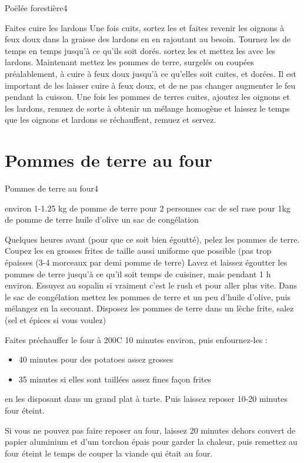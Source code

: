 {\begin{recette}{Poëlée forestière}{4}{}{}
\begin{preparation}
\etape Faites cuire les lardons
\etape Une fois cuits, sortez les et faites revenir les oignons à feux doux dans la graisse des lardons en en rajoutant au 
besoin. Tournez les de temps en temps jusqu'à ce qu'ils soit dorés.
\etape sortez les et mettez les avec les lardons. Maintenant mettez les pommes de terre, surgelés ou coupées préalablement, à 
cuire à feux doux jusqu'à ce qu'elles soit cuites, et dorées. Il est important de les laisser cuire à feux doux, et de ne pas 
changer augmenter le feu pendant la cuisson.
\etape Une fois les pommes de terres cuites, ajoutez les oignons et les lardons, remuez de sorte à obtenir un mélange homogène 
et laissez le temps que les oignons et lardons se réchauffent, remuez et servez.
\end{preparation}
\end{recette}

\section{Pommes de terre au four}
\begin{recette}{Pommes de terre au four}{4}{}{}\label{sec:pomme-de-terre-four}
\begin{ingredients}
\ingredient environ 1-1.25 kg de pomme de terre pour 2 personnes
 cac de sel rase pour 1kg de pomme de terre 
\ingredient huile d'olive
\ingredient un sac de congélation
\end{ingredients}

\begin{preparation}
\etape Quelques heures avant (pour que ce soit bien égoutté), pelez les pommes de terre. Coupez les en grosses frites de taille aussi uniforme que possible (pas trop épaisses (3-4 morceaux par demi pomme de terre)
\etape Lavez et laissez égoutter les pommes de terre jusqu'à ce qu'il soit temps de cuisiner, mais pendant 1 h environ. Essuyez au sopalin si vraiment c'est le rush et pour aller plus vite.
\etape Dans le sac de congélation mettez les pommes de terre et un peu d'huile d'olive, puis mélangez en la secouant.
\etape Disposez les pommes de terre dans un lèche frite, salez (sel et épices si vous voulez)
\end{preparation}

\begin{cuisson}
Faites préchauffer le four à 200\degres C 10 minutes environ, puis enfournez-les :
\begin{itemize}
\item 40 minutes pour des potatoes assez grosses
\item 35 minutes si elles sont taillées assez fines façon frites
\end{itemize}
en les disposant dans un grand plat à tarte. Puis laissez reposer 10-20 minutes four éteint. 
\begin{remarque}
Si vous ne pouvez pas faire reposer au four, laissez 20 minutes dehors couvert de papier aluminium et d'um torchon épais pour garder la chaleur, puis remettez au four éteint le temps de couper la viande qui était au four.
\end{remarque}


\end{cuisson}
\end{recette}}
